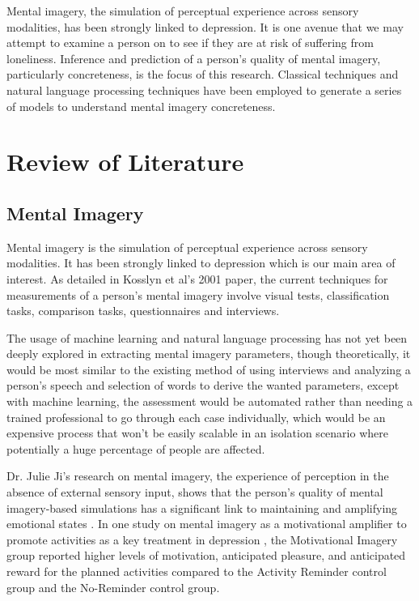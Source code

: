 \documentclass[12pt, a4paper]{article}
\begin{document}
Mental imagery, the simulation of perceptual experience across sensory modalities, has been strongly linked to depression. It is one avenue that we may attempt to examine a person on to see if they are at risk of suffering from loneliness. Inference and prediction of a person's quality of mental imagery, particularly concreteness, is the focus of this research. Classical techniques and natural language processing techniques have been employed to generate a series of models to understand mental imagery concreteness. 

\section{Review of Literature}

\subsection{Mental Imagery}
Mental imagery is the simulation of perceptual experience \cite{Kosslyn2001} across sensory modalities. It has been strongly linked to depression \cite{Patel2005} which is our main area of interest. As detailed in Kosslyn et al's 2001 paper, the current techniques for measurements of a person's mental imagery involve visual tests, classification tasks, comparison tasks, questionnaires and interviews. 

The usage of machine learning and natural language processing has not yet been deeply explored in extracting mental imagery parameters, though theoretically, it would be most similar to the existing method of using interviews and analyzing a person's speech and selection of words to derive the wanted parameters, except with machine learning, the assessment would be automated rather than needing a trained professional to go through each case individually, which would be an expensive process that won't be easily scalable in an isolation scenario where potentially a huge percentage of people are affected.

Dr. Julie Ji's research on mental imagery, the experience of perception in the absence of external sensory input, shows that the person's quality of mental imagery-based simulations has a significant link to maintaining and amplifying emotional states \cite{conceptualandclinical}. In one study on mental imagery as a motivational amplifier to promote activities as a key treatment in depression \cite{motivationalamplifier}, the Motivational Imagery group reported higher levels of motivation, anticipated pleasure, and anticipated reward for the planned activities compared to the Activity Reminder control group and the No-Reminder control group.
\end{document}
